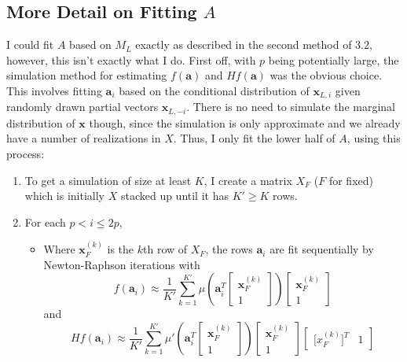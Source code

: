 \documentclass[11pt]{article}
\theoremstyle{definition}
\begin{document}
    \subsection{More Detail on Fitting $A$}
        I could fit $A$ based on $M_L$ exactly as described in the second method of $3.2$, however, this isn't exactly what I do. First off, with $p$ being potentially large, the simulation method for estimating $f(\mathbf a)$ and $H f(\mathbf a)$ was the obvious choice. This involves fitting $\mathbf a_i$ based on the conditional distribution of $\mathbf x_{L,i}$ given randomly drawn partial vectors $\mathbf x_{L,-i}$. There is no need to simulate the marginal distribution of $\mathbf x$ though, since the simulation is only approximate and we already have a number of realizations in $X$. Thus, I only fit the lower half of $A$, using this process: 
        \begin{enumerate}
            \item To get a simulation of size at least $K$, I create a matrix $X_F$ ($F$ for fixed) which is initially $X$ stacked up until it has $K'\geq K$ rows. 
            \item For each $p<i\leq 2p$,
                \begin{itemize}
                    \item Where $\mathbf x_F^{(k)}$ is the $k$th row of $X_F$, the rows $\mathbf a_i$ are fit sequentially by Newton-Raphson iterations with 
                    \[f\left(\mathbf a_i\right) \approx \frac{1}{K'}\sum_{k=1}^{K'} \mu\left(\mathbf{a}_i^T\left[\begin{array}{c} \mathbf x_F^{(k)} \\ 1 \end{array}\right]\right)\left[\begin{array}{c} \mathbf x_F^{(k)} \\ 1 \end{array}\right] \]
                    and
                    \[H f\left(\mathbf a_i\right) \approx \frac{1}{K'}\sum_{k=1}^{K'} \mu'\left(\mathbf{a}_i^T\left[\begin{array}{c} \mathbf x_F^{(k)} \\ 1 \end{array}\right]\right)\left[\begin{array}{c} \mathbf x_F^{(k)} \\ 1 \end{array}\right]\left[\begin{array}{cc} \mathbf [x_F^{(k)}]^T & 1 \end{array}\right] \]

\end{itemize}
\end{enumerate}
\end{document}
